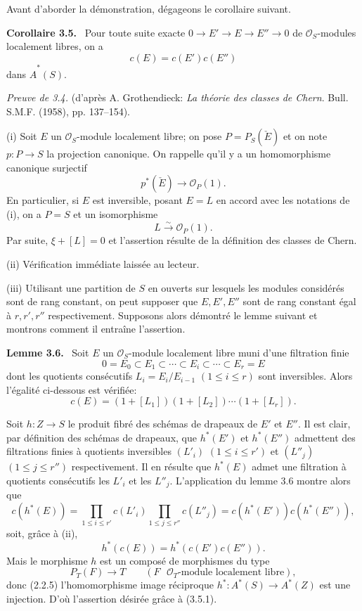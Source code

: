 \documentclass[11pt]{article}
\newenvironment{statement}[1]{\par\medskip\noindent\textbf{#1.}\ }{\par\medskip}
\begin{document}
Avant d'aborder la démonstration, dégageons le corollaire suivant.

\begin{statement}{Corollaire 3.5}
Pour toute suite exacte $0\to E'\to E\to E''\to0$ de $\mathcal O_S$-modules localement libres, on a
\[
c(E)=c(E')c(E'')
\]
dans $\widehat A^*(S)$.
\end{statement}

\emph{Preuve de 3.4.} (d'après A. Grothendieck: \emph{La théorie des classes de Chern}. Bull. S.M.F. (1958), pp. 137--154).

(i) Soit $E$ un $\mathcal O_S$-module localement libre; on pose $P=P_S(\check E)$ et on note $p:P\to S$ la projection canonique. On rappelle qu'il y a un homomorphisme canonique surjectif
\[
p^*(\check E)\longrightarrow \mathcal O_P(1).
\]
En particulier, si $E$ est inversible, posant $E=L$ en accord avec les notations de (i), on a $P=S$ et un isomorphisme
\[
L\xrightarrow{\sim}\mathcal O_P(1).
\]
Par suite, $\xi+[L]=0$ et l'assertion résulte de la définition des classes de Chern.

(ii) Vérification immédiate laissée au lecteur.

(iii) Utilisant une partition de $S$ en ouverts sur lesquels les modules considérés sont de rang constant, on peut supposer que $E,E',E''$ sont de rang constant égal à $r,r',r''$ respectivement. Supposons alors démontré le lemme suivant et montrons comment il entraîne l'assertion.

\begin{statement}{Lemme 3.6}
Soit $E$ un $\mathcal O_S$-module localement libre muni d'une filtration finie
\[
0=E_0\subset E_1\subset\cdots\subset E_i\subset\cdots\subset E_r=E
\]
dont les quotients consécutifs $L_i=E_i/E_{i-1}$ $(1\le i\le r)$ sont inversibles. Alors l'égalité ci-dessous est vérifiée:
\[
c(E)=(1+[L_1])(1+[L_2])\cdots(1+[L_r]).
\]
\end{statement}

Soit $h:Z\to S$ le produit fibré des schémas de drapeaux de $E'$ et $E''$. Il est clair, par définition des schémas de drapeaux, que $h^*(E')$ et $h^*(E'')$ admettent des filtrations finies à quotients inversibles $(L'_i)$ $(1\le i\le r')$ et $(L''_j)$ $(1\le j\le r'')$ respectivement. Il en résulte que $h^*(E)$ admet une filtration à quotients consécutifs les $L'_i$ et les $L''_j$. L'application du lemme 3.6 montre alors que
\[
c(h^*(E))=
\prod_{1\le i\le r'}c(L'_i)\prod_{1\le j\le r''}c(L''_j)
=c(h^*(E'))c(h^*(E'')),
\]
soit, grâce à (ii),
\[
h^*(c(E))=h^*(c(E')c(E'')).
\tag{3.5.1}
\]
Mais le morphisme $h$ est un composé de morphismes du type
\[
P_T(F)\longrightarrow T
\qquad (F\text{ }\mathcal O_T\text{-module localement libre}),
\]
donc (2.2.5) l'homomorphisme image réciproque $h^*:A^*(S)\to A^*(Z)$ est une injection. D'où l'assertion désirée grâce à (3.5.1).
\end{document}
